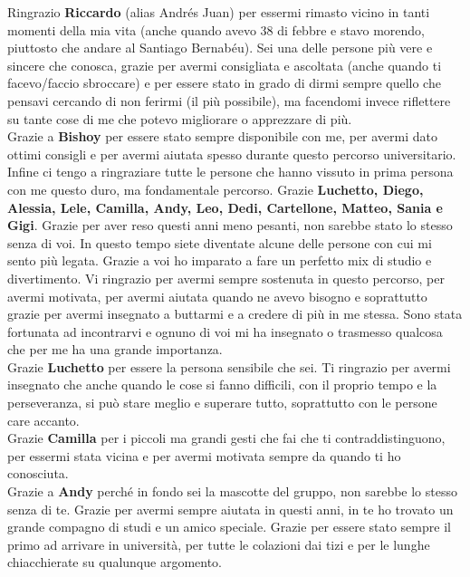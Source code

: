 \noindent Ringrazio \textbf{Riccardo} (alias Andrés Juan) per essermi rimasto vicino in tanti momenti della mia vita (anche quando avevo 38 di febbre e stavo morendo, piuttosto che andare al Santiago Bernabéu). Sei una delle persone più vere e sincere che conosca, grazie per avermi consigliata e ascoltata (anche quando ti facevo/faccio sbroccare) e per essere stato in grado di dirmi sempre quello che pensavi cercando di non ferirmi (il più possibile), ma facendomi invece riflettere su tante cose di me che potevo migliorare o apprezzare di più.\\

\noindent Grazie a \textbf{Bishoy} per essere stato sempre disponibile con me, per avermi dato ottimi consigli e per avermi aiutata spesso durante questo percorso universitario.\\ 


\noindent Infine ci tengo a ringraziare tutte le persone che hanno vissuto in prima persona con me questo duro, ma fondamentale percorso. Grazie \textbf{Luchetto, Diego, Alessia, Lele, Camilla, Andy, Leo, Dedi, Cartellone, Matteo, Sania e Gigi}. Grazie per aver reso questi anni meno pesanti, non sarebbe stato lo stesso senza di voi. In questo tempo siete diventate alcune delle persone con cui mi sento più legata. Grazie a voi ho imparato a fare un perfetto mix di studio e divertimento. Vi ringrazio per avermi sempre sostenuta in questo percorso, per avermi motivata, per avermi aiutata quando ne avevo bisogno e soprattutto grazie per avermi insegnato a buttarmi e a credere di più in me stessa. Sono stata fortunata ad incontrarvi e ognuno di voi mi ha insegnato o trasmesso qualcosa che per me ha una grande importanza.\\

\noindent Grazie \textbf{Luchetto} per essere la persona sensibile che sei. Ti ringrazio per avermi insegnato che anche quando le cose si fanno difficili, con il proprio tempo e la perseveranza, si può stare meglio e superare tutto, soprattutto con le persone care accanto.\\


\noindent Grazie \textbf{Camilla} per i piccoli ma grandi gesti che fai che ti contraddistinguono, per essermi stata vicina e per avermi motivata sempre da quando ti ho conosciuta.\\ 


\noindent Grazie a \textbf{Andy} perché in fondo sei la mascotte del gruppo, non sarebbe lo stesso senza di te. Grazie per avermi sempre aiutata in questi anni, in te ho trovato un grande compagno di studi e un amico speciale. Grazie per essere stato sempre il primo ad arrivare in università, per tutte le colazioni dai tizi e per le lunghe chiacchierate su qualunque argomento.  \\


